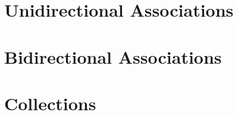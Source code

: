
\section{Unidirectional Associations}\label{sec:assoc-unidir}

\section{Bidirectional Associations}\label{sec:assoc-bidir}

\section{Collections}\label{sec:collections}
